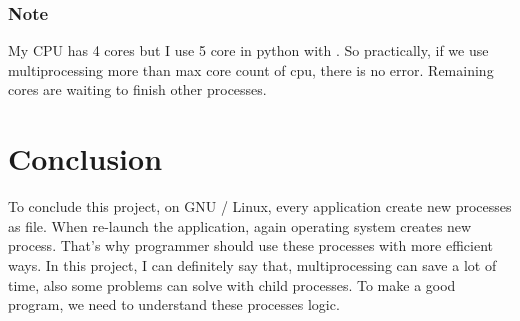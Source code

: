 \documentclass[]{article}
\begin{document}
\subsubsection*{Note}
My CPU has 4 cores but I use 5 core in python with . So practically, if we use multiprocessing more than max core count of cpu, there is no error. Remaining cores are waiting to finish other processes.
\section{Conclusion}
To conclude this project, on GNU / Linux, every application create new processes as file. When re-launch the application, again operating system creates new process.
That's why programmer should use these processes with more efficient ways. In this project, I can definitely say that, multiprocessing can save a lot of time, also some problems can solve with child processes. To make a good program, we need to understand these processes logic.



\nocite{*}


\end{document}
